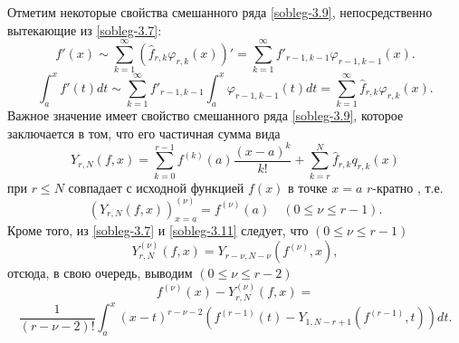Отметим некоторые свойства смешанного ряда \eqref{sobleg-3.9}, непосредственно вытекающие из \eqref{sobleg-3.7}:
\begin{equation}\label{equ102-2.1}
f'(x)\sim \sum_{k=1}^\infty (\hat f_{r,k}\varphi_{r,k}(x))'= \sum_{k=1}^\infty f'_{r-1,k-1}\varphi_{r-1,k-1}(x).
\end{equation}
\begin{equation}\label{equ102-2.2}
\int_a^xf'(t)dt\sim \sum_{k=1}^\infty f'_{r-1,k-1}\int_a^x\varphi_{r-1,k-1}(t)dt=\sum_{k=1}^\infty \hat f_{r,k}\varphi_{r,k}(x).
\end{equation}
Важное значение имеет свойство  смешанного ряда \eqref{sobleg-3.9}, которое заключается в том, что его частичная сумма вида
\begin{equation}\label{sobleg-3.11}
Y_{r,N}(f,x)=\sum_{k=0}^{r-1} f^{(k)}(a)\frac{(x-a)^k}{k!}+ \sum_{k=r}^{N} \hat f_{r,k}q_{r,k}(x)
\end{equation}
 при   $r\le N$  совпадает с исходной функцией $f(x)$   в точке $x=a$ $r$-кратно , т.е.
\begin{equation}\label{sobleg-3.12}
(Y_{r,N}(f,x))^{(\nu)}_{x=a}=f^{(\nu)}(a)\quad (0\le\nu\le r-1).
\end{equation}
Кроме того, из \eqref{sobleg-3.7} и \eqref{sobleg-3.11} следует, что $(0\le\nu\le r-1)$
\begin{equation}\label{sobleg-3.13}
 Y_{r,N}^{(\nu)}(f,x)=Y_{r-\nu,N-\nu}(f^{(\nu)},x),
 \end{equation}
отсюда, в свою очередь, выводим $(0\le\nu\le r-2)$
 $$
f^{(\nu)}(x)-Y_{r,N}^{(\nu)}(f,x)=
$$
  \begin{equation}\label{sobleg-3.14}
\frac{1}{(r-\nu-2)!}\int_a^x (x-t)^{r-\nu-2}(f^{(r-1)}(t)-Y_{1,N-r+1}(f^{(r-1)},t))dt.
 \end{equation}

